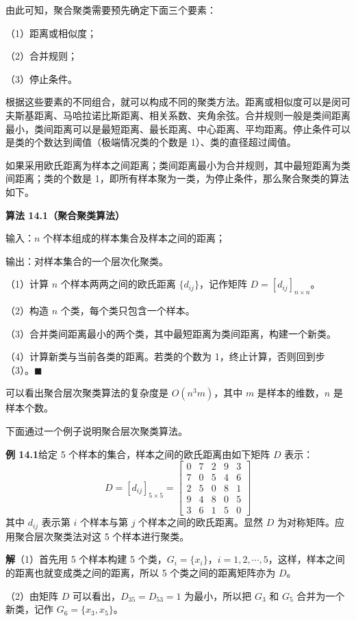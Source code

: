 \documentclass[UTF8,12pt,a4paper,fontset=fandol]{ctexart}
\begin{document}
由此可知，聚合聚类需要预先确定下面三个要素：

（1）距离或相似度；

（2）合并规则；

（3）停止条件。

根据这些要素的不同组合，就可以构成不同的聚类方法。距离或相似度可以是闵可夫斯基距离、马哈拉诺比斯距离、相关系数、夹角余弦。合并规则一般是类间距离最小，类间距离可以是最短距离、最长距离、中心距离、平均距离。停止条件可以是类的个数达到阈值（极端情况类的个数是 1）、类的直径超过阈值。

如果采用欧氏距离为样本之间距离；类间距离最小为合并规则，其中最短距离为类间距离；类的个数是 1，即所有样本聚为一类，为停止条件，那么聚合聚类的算法如下。

\noindent\textbf{算法 14.1（聚合聚类算法）}

输入：$n$ 个样本组成的样本集合及样本之间的距离；

输出：对样本集合的一个层次化聚类。

（1）计算 $n$ 个样本两两之间的欧氏距离 $\{d_{ij}\}$，记作矩阵 $D=[d_{ij}]_{n\times n}$。

（2）构造 $n$ 个类，每个类只包含一个样本。

（3）合并类间距离最小的两个类，其中最短距离为类间距离，构建一个新类。

（4）计算新类与当前各类的距离。若类的个数为 1，终止计算，否则回到步（3）。\hfill$\blacksquare$

可以看出聚合层次聚类算法的复杂度是 $O(n^3m)$，其中 $m$ 是样本的维数，$n$ 是样本个数。

下面通过一个例子说明聚合层次聚类算法。

\noindent\textbf{例 14.1}\quad 给定 5 个样本的集合，样本之间的欧氏距离由如下矩阵 $D$ 表示：
\[
D=[d_{ij}]_{5\times 5}=
\begin{bmatrix}
0 & 7 & 2 & 9 & 3\\
7 & 0 & 5 & 4 & 6\\
2 & 5 & 0 & 8 & 1\\
9 & 4 & 8 & 0 & 5\\
3 & 6 & 1 & 5 & 0
\end{bmatrix}
\]
其中 $d_{ij}$ 表示第 $i$ 个样本与第 $j$ 个样本之间的欧氏距离。显然 $D$ 为对称矩阵。应用聚合层次聚类法对这 5 个样本进行聚类。

\noindent\textbf{解}\quad （1）首先用 5 个样本构建 5 个类，$G_i=\{x_i\}$，$i=1,2,\cdots,5$，这样，样本之间的距离也就变成类之间的距离，所以 5 个类之间的距离矩阵亦为 $D$。

（2）由矩阵 $D$ 可以看出，$D_{35}=D_{53}=1$ 为最小，所以把 $G_3$ 和 $G_5$ 合并为一个新类，记作 $G_6=\{x_3,x_5\}$。
\end{document}
